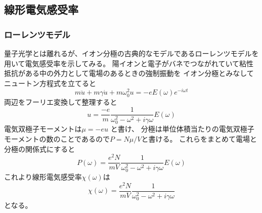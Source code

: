 \documentclass[11pt,dvipdfmx,a4paper]{jsarticle}
\begin{document}
\subsection{線形電気感受率}
\subsubsection{ローレンツモデル}
量子光学とは離れるが、イオン分極の古典的なモデルであるローレンツモデルを用いて電気感受率を示してみる。
陽イオンと電子がバネでつながれていて粘性抵抗がある中の外力として電場のあるときの強制振動を
イオン分極とみなしてニュートン方程式を立てると
\begin{equation}
	m\ddot{u} + m\gamma\dot{u} +m\omega_0^2 u = -eE(\omega)e^{-i\omega t}
\end{equation}
両辺をフーリエ変換して整理すると
\begin{equation}
	u = \frac{-e}{m}\frac{1}{\omega_0^2-\omega^2 + i\gamma\omega} E(\omega)
\end{equation}
電気双極子モーメントは\(\mu = - eu\) と書け、
分極は単位体積当たりの電気双極子モーメントの数のことであるので\(P = N\mu/V\)と書ける。
これらをまとめて電場と分極の関係式にすると
\begin{equation}
	P(\omega) = \frac{e^2N}{mV} \frac{1}{\omega_0^2-\omega^2+i\gamma\omega} E(\omega)
\end{equation}
これより線形電気感受率\(\chi(\omega)\)は
\begin{equation}
	\chi(\omega) = \frac{e^2N}{mV} \frac{1}{\omega_0^2-\omega^2+i\gamma\omega}
\end{equation}
となる。
\end{document}
